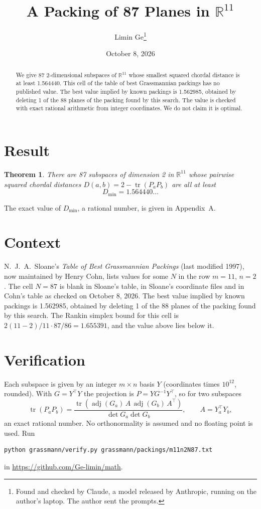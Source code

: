 \documentclass[11pt,a4paper]{article}
\title{A Packing of 87 Planes in $\mathbb{R}^{11}$}
\author{Limin Ge\thanks{Found and checked by Claude, a model released by Anthropic, running on the author's laptop. The author sent the prompts.}}
\date{October 8, 2026}
\newtheorem*{theorem}{Theorem}
\begin{document}
\maketitle
\begin{abstract}
We give 87 2-dimensional subspaces of $\mathbb{R}^{11}$ whose smallest squared chordal distance is at least 1.564440. This cell of the table of best Grassmannian packings has no published value. The best value implied by known packings is 1.562985, obtained by deleting 1 of the 88 planes of the packing found by this search. The value is checked with exact rational arithmetic from integer coordinates. We do not claim it is optimal.
\end{abstract}

\section{Result}
\begin{theorem}
There are 87 subspaces of dimension 2 in $\mathbb{R}^{11}$ whose pairwise squared chordal distances $D(a,b) = 2 - \operatorname{tr}(P_aP_b)$ are all at least
\[ D_{\min} = 1.564440\ldots \]
\end{theorem}
The exact value of $D_{\min}$, a rational number, is given in Appendix~A.


\section{Context}
N.~J.~A.~Sloane's \emph{Table of Best Grassmannian Packings} (last modified 1997), now maintained by Henry Cohn, lists values for some $N$ in the row $m=11$, $n=2$. The cell $N=87$ is blank in Sloane's table, in Sloane's coordinate files and in Cohn's table as checked on October 8, 2026. The best value implied by known packings is 1.562985, obtained by deleting 1 of the 88 planes of the packing found by this search. The Rankin simplex bound for this cell is $2(11-2)/11\cdot 87/86 = 1.655391$, and the value above lies below it.


\section{Verification}
Each subspace is given by an integer $m\times n$ basis $Y$ (coordinates times $10^{12}$, rounded). With $G=Y^\top Y$ the projection is $P=YG^{-1}Y^\top$, so for two subspaces
\[ \operatorname{tr}(P_aP_b)=\frac{\operatorname{tr}(\operatorname{adj}(G_a)\,A\,\operatorname{adj}(G_b)\,A^\top)}{\det G_a\det G_b},\qquad A=Y_a^\top Y_b, \]
an exact rational number. No orthonormality is assumed and no floating point is used. Run
\begin{verbatim}
python grassmann/verify.py grassmann/packings/m11n2N87.txt
\end{verbatim}
in \url{https://github.com/Ge-limin/math}.
\end{document}
